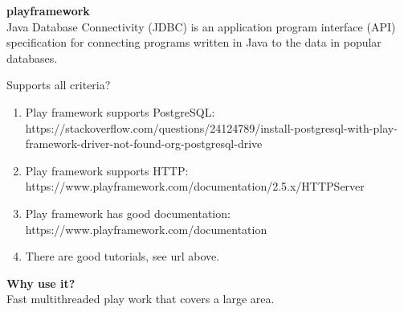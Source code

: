 
\textbf{playframework} \\
Java Database Connectivity (JDBC) is an application program interface (API) specification for connecting programs written in Java to the data in popular databases.

Supports all criteria? \\
\begin{enumerate}
	\item Play framework supports PostgreSQL:  https://stackoverflow.com/questions/24124789/install-postgresql-with-play-framework-driver-not-found-org-postgresql-drive
	\item Play framework supports HTTP: https://www.playframework.com/documentation/2.5.x/HTTPServer
	\item Play framework has good documentation: https://www.playframework.com/documentation
	\item There are good tutorials, see url above.
\end{enumerate}

\textbf{Why use it?} \\
Fast multithreaded play work that covers a large area.\\


